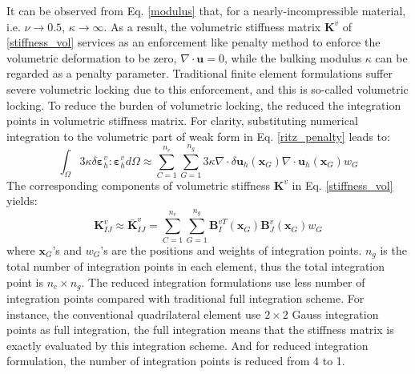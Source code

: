 It can be observed from Eq. \eqref{modulus} that, for a nearly-incompressible material, i.e. $\nu \rightarrow 0.5$, $\kappa \rightarrow \infty$. As a result, the volumetric stiffness matrix $\boldsymbol K^v$ of \eqref{stiffness_vol} services as an enforcement like penalty method to enforce the volumetric deformation to be zero, $\nabla \cdot \boldsymbol u = 0$, while the bulking modulus $\kappa$ can be regarded as a penalty parameter.
Traditional finite element formulations suffer severe volumetric locking due to this enforcement, and this is so-called volumetric locking. 
To reduce the burden of volumetric locking, the reduced the integration points in volumetric stiffness matrix. For clarity, substituting numerical integration to the volumetric part of weak form in Eq. \eqref{ritz_penalty} leads to:
\begin{equation}
\int_\Omega 3\kappa \delta \boldsymbol \varepsilon^v_h : \boldsymbol \varepsilon^v_h d\Omega \approx
\sum_{C=1}^{n_e}\sum_{G=1}^{n_g} 3\kappa \nabla \cdot \delta \boldsymbol u_h(\boldsymbol x_G) \nabla \cdot \boldsymbol u_h(\boldsymbol x_G) w_G
\end{equation}
The corresponding components of volumetric stiffness $\boldsymbol K^v$ in Eq. \eqref{stiffness_vol} yields:
\begin{equation}
    \boldsymbol K^v_{IJ} \approx \bar{\boldsymbol K}^v_{IJ} = \sum_{C=1}^{n_e}\sum_{G=1}^{n_g} \boldsymbol B^{vT}_I(\boldsymbol x_G) \boldsymbol B_J^v(\boldsymbol x_G) w_G
\end{equation}
where $\boldsymbol x_G$'s and $w_G$'s are the positions and weights of integration points. $n_g$ is the total number of integration points in each element, thus the total integration point is $n_c \times n_g$. The reduced integration formulations use less number of integration points compared with traditional full integration scheme. For instance, the conventional quadrilateral element use $2\times 2$ Gauss integration points as full integration, the full integration means that the stiffness matrix is exactly evaluated by this integration scheme. And for reduced integration formulation, the number of integration points is reduced from 4 to 1.

